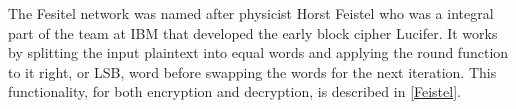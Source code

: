 \documentclass[12pt,twoside,a4paper]{report}
\begin{document}
    
    The Fesitel network was named after physicist Horst Feistel who was a integral part of the team at IBM that developed the early block cipher Lucifer. It works by splitting the input plaintext into equal words and applying the round function to it right, or LSB, word before swapping the words for the next iteration. This functionality, for both encryption and decryption, is described in \autoref{Feistel}.
    
\end{document}
